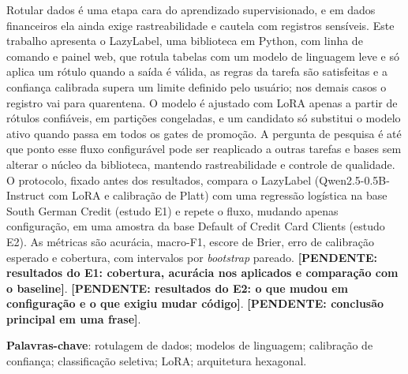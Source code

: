 \documentclass[12pt,oneside,a4paper,chapter=TITLE,section=TITLE,english,brazil]{abntex2}
\newcommand{\pendente}[1]{\textbf{[PENDENTE: #1]}}
\begin{document}
\setlength{\absparsep}{18pt}
\begin{resumo}
Rotular dados é uma etapa cara do aprendizado supervisionado, e em dados financeiros ela ainda exige rastreabilidade e cautela com registros sensíveis. Este trabalho apresenta o LazyLabel, uma biblioteca em Python, com linha de comando e painel web, que rotula tabelas com um modelo de linguagem leve e só aplica um rótulo quando a saída é válida, as regras da tarefa são satisfeitas e a confiança calibrada supera um limite definido pelo usuário; nos demais casos o registro vai para quarentena. O modelo é ajustado com LoRA apenas a partir de rótulos confiáveis, em partições congeladas, e um candidato só substitui o modelo ativo quando passa em todos os gates de promoção. A pergunta de pesquisa é até que ponto esse fluxo configurável pode ser reaplicado a outras tarefas e bases sem alterar o núcleo da biblioteca, mantendo rastreabilidade e controle de qualidade. O protocolo, fixado antes dos resultados, compara o LazyLabel (Qwen2.5-0.5B-Instruct com LoRA e calibração de Platt) com uma regressão logística na base South German Credit (estudo E1) e repete o fluxo, mudando apenas configuração, em uma amostra da base Default of Credit Card Clients (estudo E2). As métricas são acurácia, macro-F1, escore de Brier, erro de calibração esperado e cobertura, com intervalos por \emph{bootstrap} pareado. \pendente{resultados do E1: cobertura, acurácia nos aplicados e comparação com o baseline}. \pendente{resultados do E2: o que mudou em configuração e o que exigiu mudar código}. \pendente{conclusão principal em uma frase}.

\textbf{Palavras-chave}: rotulagem de dados; modelos de linguagem; calibração de confiança; classificação seletiva; LoRA; arquitetura hexagonal.
\end{resumo}
\end{document}
